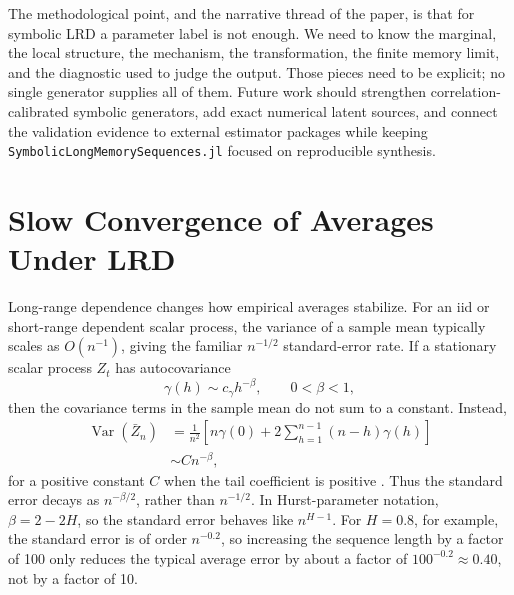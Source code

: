 \documentclass[journal]{IEEEtran}
\newcommand{\pkg}[1]{\texttt{#1}}
\newcommand{\sfive}{\pkg{SymbolicLongMemorySequences.jl}}
\begin{document}
The methodological point, and the narrative thread of the paper, is that for
symbolic LRD a parameter label is not enough.  We need to know the marginal, the
local structure, the mechanism, the transformation, the finite memory limit, and
the diagnostic used to judge the output.  Those pieces need to be explicit; no
single generator supplies all of them.  Future work should strengthen
correlation-calibrated symbolic generators, add exact numerical latent sources,
and connect the validation evidence to external estimator packages while keeping
\sfive{} focused on reproducible synthesis.
\appendices
\section{Slow Convergence of Averages Under LRD}

Long-range dependence changes how empirical averages stabilize. For an iid or
short-range dependent scalar process, the variance of a sample mean typically
scales as \(O(n^{-1})\), giving the familiar \(n^{-1/2}\) standard-error
rate. If a stationary scalar process \(Z_t\) has autocovariance
\begin{equation}
  \gamma(h) \sim c_\gamma h^{-\beta}, \qquad 0<\beta<1,
\end{equation}
then the covariance terms in the sample mean do not sum to a constant. Instead,
\begin{align}
  \operatorname{Var}(\bar Z_n)
  &= \frac{1}{n^2}
     \left[n\gamma(0)+2\sum_{h=1}^{n-1}(n-h)\gamma(h)\right] \\
  &\sim C n^{-\beta},
\end{align}
for a positive constant \(C\) when the tail coefficient is positive
\cite{beran1994_statistics,samorodnitsky2006_long,pipiras2017_long}. Thus the
standard error decays as \(n^{-\beta/2}\), rather than \(n^{-1/2}\). In
Hurst-parameter notation, \(\beta=2-2H\), so the standard error behaves like
\(n^{H-1}\). For \(H=0.8\), for example, the standard error is of order
\(n^{-0.2}\), so increasing the sequence length by a factor of 100 only reduces
the typical average error by about a factor of \(100^{-0.2}\approx 0.40\),
not by a factor of 10.
\end{document}
